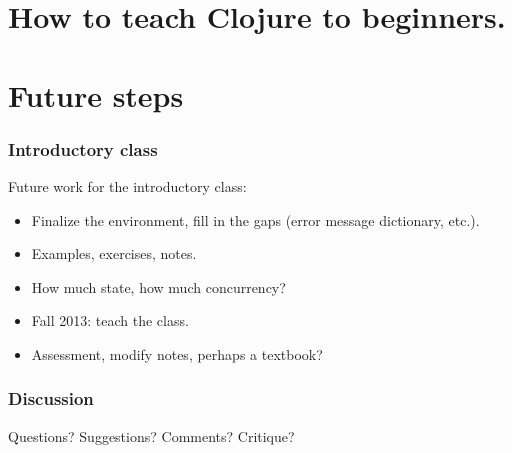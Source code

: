 \documentclass{beamer}
\begin{document}
\section{How to teach Clojure to beginners.}


\section{Future steps}

\begin{frame}
  \frametitle{Introductory class}
Future work for the introductory class:
\begin{itemize}
\item Finalize the environment, fill in the gaps (error message dictionary, etc.).
\item Examples, exercises, notes. 
\item How much state, how much concurrency?
\item Fall 2013: teach the class.
\item Assessment, modify notes, perhaps a textbook?
\end{itemize}
\end{frame}



\begin{frame}
  \frametitle{Discussion}
Questions? Suggestions? Comments? Critique? 
\end{frame}
\end{document}

